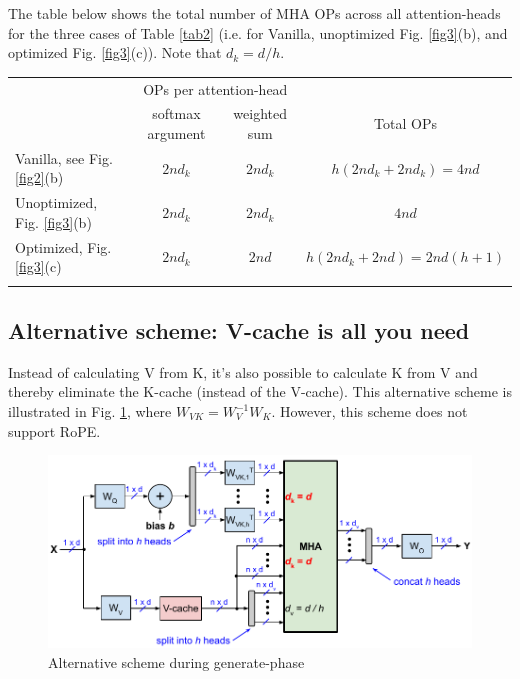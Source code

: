 \documentclass{article}
\newcommand{\mc}[2]{\multicolumn{#1}{c}{#2}}  %
\def\fline{\Xhline{2\arrayrulewidth}} %
\begin{document}
The table below shows the total number of MHA OPs across all attention-heads for the three cases of Table \ref{tab2} (i.e. for Vanilla, unoptimized Fig. \ref{fig3}(b), and optimized Fig. \ref{fig3}(c)). Note that $d_k = d / h$.
\begingroup \renewcommand{\arraystretch}{1.3} %
\begin{table}[h!] \centering \begin{tabular}{lccc} \fline
                                  & \mc{2}{OPs per attention-head}   &                            \\
                                  & softmax argument & weighted sum  & Total OPs                  \\ \hline
  Vanilla, see Fig. \ref{fig2}(b) & $2nd_k$          & $2nd_k$       & $h(2nd_k + 2nd_k) = 4nd$    \\
  Unoptimized, Fig. \ref{fig3}(b) & $2nd_k$          & $2nd_k$       & $4nd$                       \\
  Optimized, Fig. \ref{fig3}(c)   & $2nd_k$          & $2nd$         & $h(2nd_k + 2nd) = 2nd(h+1)$ \\ \fline
\end{tabular} \end{table} \endgroup

\subsection*{Alternative scheme: V-cache is all you need}
Instead of calculating V from K, it's also possible to calculate K from V and thereby eliminate the K-cache (instead of the V-cache). This alternative scheme is illustrated in Fig. \ref{fig6}, where $W_{VK} = W_V^{-1} W_K$. However, this scheme does not support RoPE.
\begin{figure}[h!] \centering
  \includegraphics[scale=0.88]{../doc/fig/slimAttn_fig6.pdf}
  \caption{Alternative scheme during generate-phase}
\label{fig6} \end{figure}
\end{document}
